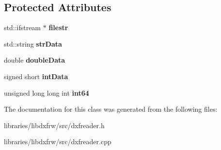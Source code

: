 \subsection*{Protected Attributes}
\begin{DoxyCompactItemize}
\item 
\hypertarget{classdxfReader_a2dcd1bdec9d09a69937d29a2001dc529}{std\-::ifstream $\ast$ {\bfseries filestr}}\label{classdxfReader_a2dcd1bdec9d09a69937d29a2001dc529}

\item 
\hypertarget{classdxfReader_ab06bfe2da193f7aaf8b8b75ed224167e}{std\-::string {\bfseries str\-Data}}\label{classdxfReader_ab06bfe2da193f7aaf8b8b75ed224167e}

\item 
\hypertarget{classdxfReader_ac7783cdeb203ddf3e48c5d9dbe98418d}{double {\bfseries double\-Data}}\label{classdxfReader_ac7783cdeb203ddf3e48c5d9dbe98418d}

\item 
\hypertarget{classdxfReader_a69061bfb5a607ec4760973135afac30e}{signed short {\bfseries int\-Data}}\label{classdxfReader_a69061bfb5a607ec4760973135afac30e}

\item 
\hypertarget{classdxfReader_a868e866b18e256ba5cc0520f9df27054}{unsigned long long int {\bfseries int64}}\label{classdxfReader_a868e866b18e256ba5cc0520f9df27054}

\end{DoxyCompactItemize}


The documentation for this class was generated from the following files\-:\begin{DoxyCompactItemize}
\item 
libraries/libdxfrw/src/dxfreader.\-h\item 
libraries/libdxfrw/src/dxfreader.\-cpp\end{DoxyCompactItemize}
